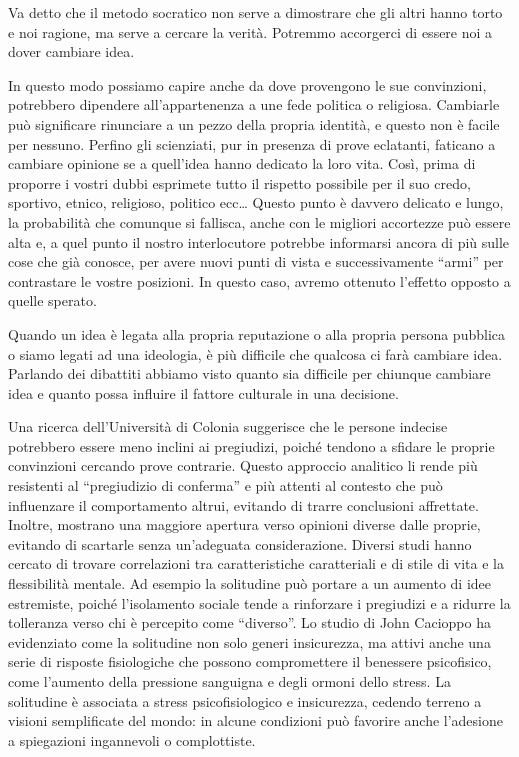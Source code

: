 \documentclass[12pt]{book} %
\begin{document}
Va detto che il metodo socratico non serve a dimostrare che gli altri hanno torto e noi ragione, ma serve a cercare la
verità. Potremmo accorgerci di essere noi a dover cambiare idea.

In questo modo possiamo capire anche da dove provengono le sue convinzioni, potrebbero dipendere
all'appartenenza a une fede politica o religiosa. Cambiarle può significare rinunciare a un pezzo della
propria identità, e questo non è facile per nessuno. Perfino gli scienziati, pur in presenza di prove eclatanti,
faticano a cambiare opinione se a quell'idea hanno dedicato la loro vita. Così, prima di proporre
i vostri dubbi esprimete tutto il rispetto possibile per il suo credo, sportivo, etnico, religioso, politico ecc…
Questo punto è davvero delicato e lungo, la probabilità che comunque si fallisca, anche con le migliori accortezze può essere
alta e, a quel punto il nostro interlocutore potrebbe informarsi ancora di più sulle cose che già conosce, per avere
nuovi punti di vista e successivamente “armi” per contrastare le vostre posizioni. In questo caso, avremo ottenuto l'effetto opposto a quelle sperato.

Quando un idea è legata alla propria reputazione o alla propria persona pubblica o siamo legati ad una ideologia, è più difficile che qualcosa ci farà cambiare idea. 
Parlando dei dibattiti abbiamo visto quanto sia difficile per chiunque cambiare idea e quanto possa influire il fattore culturale in una decisione.

Una ricerca dell’Università di Colonia suggerisce che le persone indecise potrebbero essere meno inclini ai pregiudizi, poiché tendono a sfidare le proprie convinzioni cercando prove contrarie. Questo approccio analitico li rende più resistenti al “pregiudizio di conferma” e più attenti al contesto che può influenzare il comportamento altrui, evitando di trarre conclusioni affrettate. Inoltre, mostrano una maggiore apertura verso opinioni diverse dalle proprie, evitando di scartarle senza un’adeguata considerazione.
Diversi studi hanno cercato di trovare correlazioni tra caratteristiche caratteriali e di stile di vita e la flessibilità mentale. Ad esempio la solitudine può portare a un aumento di idee estremiste, poiché l’isolamento sociale tende a rinforzare i pregiudizi e a ridurre la tolleranza verso chi è percepito come “diverso”. Lo studio di John Cacioppo ha evidenziato come la solitudine non solo generi insicurezza, ma attivi anche una serie di risposte fisiologiche che possono compromettere il benessere psicofisico, come l’aumento della pressione sanguigna e degli ormoni dello stress. La solitudine è associata a stress psicofisiologico e insicurezza, cedendo terreno a visioni semplificate del mondo: in alcune condizioni può favorire anche l’adesione a spiegazioni ingannevoli o complottiste.
\end{document}
